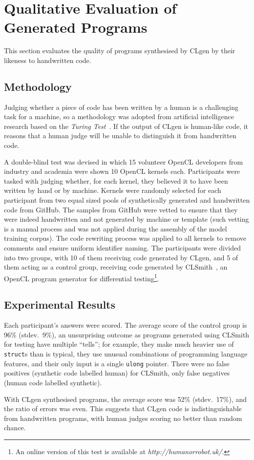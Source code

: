 \section{Qualitative Evaluation of Generated Programs}
\label{sec:clgen-qualitative-evaluation}

This section evaluates the quality of programs synthesised by CLgen by their likeness to handwritten code.

\subsection{Methodology}

Judging whether a piece of code has been written by a human is a challenging task for a machine, so a methodology was adopted from artificial intelligence research based on the \emph{Turing Test}~\cite{Gao2015a,Zhang2016,Vinyals}. If the output of CLgen is human-like code, it reasons that a human judge will be unable to distinguish it from handwritten code.

A double-blind test was devised in which 15 volunteer OpenCL developers from industry and academia were shown 10 OpenCL kernels each. Participants were tasked with judging whether, for each kernel, they believed it to have been written by hand or by machine. Kernels were randomly selected for each participant from two equal sized pools of synthetically generated and handwritten code from GitHub. The samples from GitHub were vetted to ensure that they were indeed handwritten and not generated by machine or template (such vetting is a manual process and was not applied during the assembly of the model training corpus). The code rewriting process was applied to all kernels to remove comments and ensure uniform identifier naming. The participants were divided into two groups, with 10 of them receiving code generated by CLgen, and 5 of them acting as a control group, receiving code generated by CLSmith~\cite{Lidbury2015a}, an OpenCL program generator for differential testing\footnote{An online version of this test is available at \emph{http://humanorrobot.uk/}.}.

\subsection{Experimental Results}

Each participant's answers were scored. The average score of the control group is 96\% (stdev.\ 9\%), an unsurprising outcome as programs generated using CLSmith for testing have multiple ``tells''; for example, they make much heavier use of \texttt{struct}s than is typical, they use unusual combinations of programming language features, and their only input is a single \texttt{ulong} pointer. There were no false positives (synthetic code labelled human) for CLSmith, only false negatives (human code labelled synthetic).

With CLgen synthesised programs, the average score was 52\% (stdev.\ 17\%), and the ratio of errors was even. This suggests that CLgen code is indistinguishable from handwritten programs, with human judges scoring no better than random chance.
